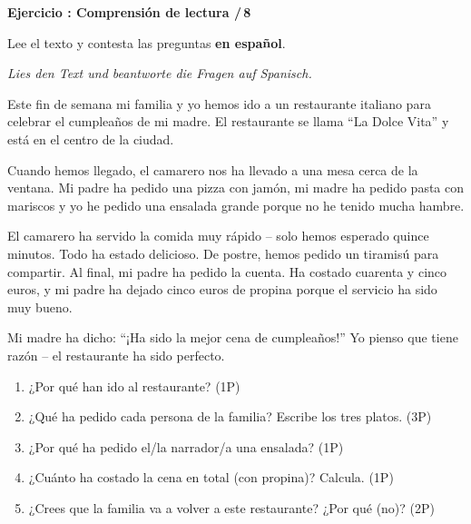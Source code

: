 \documentclass[a4paper,11pt]{article}
\newcommand{\luecke}[1]{\underline{\hspace{#1}}}
\newcommand{\punkte}[1]{\hfill\textcolor{mittelgrau}{\small /\,#1}}
\newcounter{aufgabe}
\newenvironment{aufgabe}[2]{%
    \refstepcounter{aufgabe}
    \vspace{4mm}
    \noindent\textbf{\color{spanisch}Ejercicio \theaufgabe: #1 \punkte{#2}}
    \vspace{1.5mm}
    \par
}{%
    \vspace{2mm}
}
\begin{document}
\begin{aufgabe}{Comprensión de lectura}{8}

Lee el texto y contesta las preguntas \textbf{en español}.

{\small\textit{Lies den Text und beantworte die Fragen auf Spanisch.}}

\vspace{2mm}

\begin{tcolorbox}[colback=hellgrau, colframe=mittelgrau, boxrule=0.5pt, arc=0pt, title={\small\bfseries Una cena especial}]
{\small
Este fin de semana mi familia y yo hemos ido a un restaurante italiano para celebrar el cumpleaños de mi madre. El restaurante se llama ``La Dolce Vita'' y está en el centro de la ciudad.

Cuando hemos llegado, el camarero nos ha llevado a una mesa cerca de la ventana. Mi padre ha pedido una pizza con jamón, mi madre ha pedido pasta con mariscos y yo he pedido una ensalada grande porque no he tenido mucha hambre.

El camarero ha servido la comida muy rápido -- solo hemos esperado quince minutos. Todo ha estado delicioso. De postre, hemos pedido un tiramisú para compartir. Al final, mi padre ha pedido la cuenta. Ha costado cuarenta y cinco euros, y mi padre ha dejado cinco euros de propina porque el servicio ha sido muy bueno.

Mi madre ha dicho: ``¡Ha sido la mejor cena de cumpleaños!'' Yo pienso que tiene razón -- el restaurante ha sido perfecto.
}
\end{tcolorbox}

\vspace{3mm}

\begin{enumerate}[itemsep=5mm]
    \item ¿Por qué han ido al restaurante? (1P)

    \luecke{12cm}

    \item ¿Qué ha pedido cada persona de la familia? Escribe los tres platos. (3P)

    \luecke{12cm}

    \item ¿Por qué ha pedido el/la narrador/a una ensalada? (1P)

    \luecke{12cm}

    \item ¿Cuánto ha costado la cena en total (con propina)? Calcula. (1P)

    \luecke{12cm}

    \item ¿Crees que la familia va a volver a este restaurante? ¿Por qué (no)? (2P)

    \luecke{12cm}

\end{enumerate}

\end{aufgabe}
\end{document}
